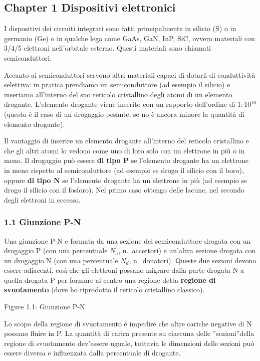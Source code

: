 \documentclass[
]{article}
\begin{document}
\subsection{Chapter 1 Dispositivi
elettronici}\label{chapter-1-dispositivi-elettronici}

I dispositivi dei circuiti integrati sono fatti principalmente in
silicio (S) o in germanio (Ge) o in qualche lega come GaAs, GaN, InP,
SiC, ovvero materiali con 3/4/5 elettroni nell'orbitale esterno. Questi
materiali sono chiamati semiconduttori.

Accanto ai semiconduttori servono altri materiali capaci di dotarli di
conduttività selettiva: in pratica prendiamo un semiconduttore (ad
esempio il silicio) e inseriamo all'interno del suo reticolo cristallino
degli atomi di un elemento drogante. L'elemento drogante viene inserito
con un rapporto dell'ordine di \(1:10{}^{10}\) (questo è il caso di un
drogaggio pesante, se no è ancora minore la quantità di elemento
drogante).

Il vantaggio di inserire un elemento drogante all'interno del reticolo
cristallino e che gli altri atomi lo vedono come uno di loro solo con un
elettrone in più o in meno. Il drogaggio può essere \textbf{di tipo P}
se l'elemento drogante ha un elettrone in meno rispetto al
semiconduttore (ad esempio se drogo il silicio con il boro), oppure
\textbf{di tipo N} se l'elemento drogante ha un elettrone in più (ad
esempio se drogo il silicio con il fosforo). Nel primo caso ottengo
delle lacune, nel secondo degli elettroni in eccesso.

\subsubsection{1.1 Giunzione P-N}\label{giunzione-p-n}

Una giunzione P-N e formata da una sezione del semiconduttore drogata
con un drogaggio P (con una percentuale \(N_{a}\), n.~accettori) e
un'altra sezione drogata con un drogaggio N (con una percentuale
\(N_{d}\), n.~donatori). Queste due sezioni devono essere adiacenti,
così che gli elettroni possano migrare dalla parte drogata N a quella
drogata P per formare al centro una regione detta \textbf{regione di
svuotamento} (dove ho riprodotto il reticolo cristallino classico).

Figure 1.1: Giunzione P-N

Lo scopo della regione di svuotamento è impedire che altre cariche
negative di N possano fluire in P. La quantità di carica presente su
ciascuna delle ''sezioni''della regione di svuotamento dev'essere
uguale, tuttavia le dimensioni delle sezioni può essere diversa e
influenzata dalla percentuale di drogante.
\end{document}
